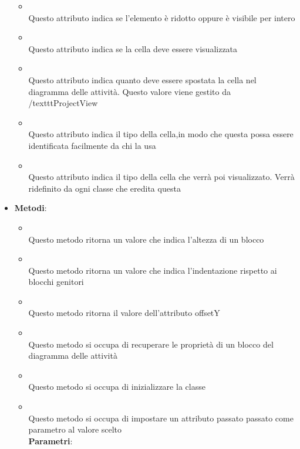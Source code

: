 \begin{itemize}
\begin{itemize}
\item {}
\\ Questo attributo indica se l'elemento è ridotto oppure è visibile per intero
\item {}
\\ Questo attributo indica se la cella deve essere visualizzata
\item {}
\\ Questo attributo indica quanto deve essere spostata la cella nel diagramma delle attività. Questo valore viene gestito da /texttt{ProjectView}
\item {}
\\ Questo attributo indica il tipo della cella,in modo  che questa possa essere identificata facilmente da chi la usa
\item {}
\\ Questo attributo indica il tipo della cella che verrà poi visualizzato. Verrà ridefinito da ogni classe che eredita questa
\end{itemize}
\item \textbf{Metodi}:
\begin{itemize}
\item {}
\\ Questo metodo ritorna un valore che indica l'altezza di un blocco
\item {}
\\ Questo metodo ritorna un valore che indica l'indentazione rispetto ai blocchi genitori
\item {}
\\ Questo metodo ritorna il valore dell'attributo offsetY
\item {}
\\ Questo metodo si occupa di recuperare le proprietà di un blocco del diagramma delle attività
\item {}
\\ Questo metodo si occupa di inizializzare la classe
\item {}
\\ Questo metodo si occupa di impostare un attributo passato passato come parametro al valore scelto
\\ \textbf{Parametri}:

\end{itemize}
\end{itemize}

